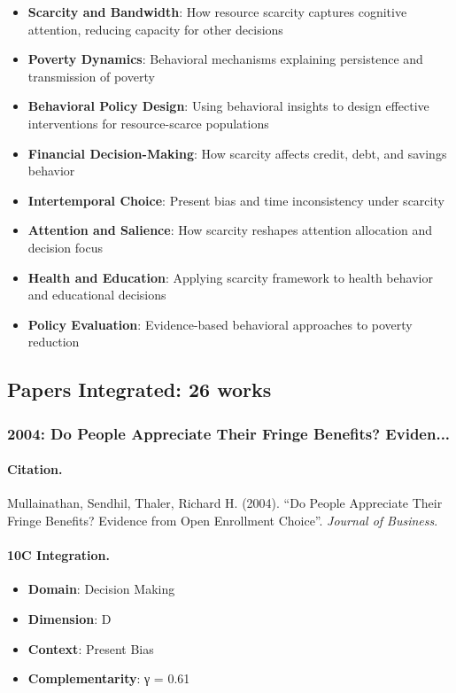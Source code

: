 \begin{itemize}
  \item \textbf{Scarcity and Bandwidth}: How resource scarcity captures cognitive attention, reducing capacity for other decisions
  \item \textbf{Poverty Dynamics}: Behavioral mechanisms explaining persistence and transmission of poverty
  \item \textbf{Behavioral Policy Design}: Using behavioral insights to design effective interventions for resource-scarce populations
  \item \textbf{Financial Decision-Making}: How scarcity affects credit, debt, and savings behavior
  \item \textbf{Intertemporal Choice}: Present bias and time inconsistency under scarcity
  \item \textbf{Attention and Salience}: How scarcity reshapes attention allocation and decision focus
  \item \textbf{Health and Education}: Applying scarcity framework to health behavior and educational decisions
  \item \textbf{Policy Evaluation}: Evidence-based behavioral approaches to poverty reduction
\end{itemize}

\subsection{Papers Integrated: 26 works}


\subsubsection{2004: Do People Appreciate Their Fringe Benefits? Eviden...}

\paragraph{Citation.}
Mullainathan, Sendhil, Thaler, Richard H. (2004). ``Do People Appreciate Their Fringe Benefits? Evidence from Open Enrollment Choice''. \textit{Journal of Business}.

\paragraph{10C Integration.}
\begin{itemize}[nosep]
  \item \textbf{Domain}: Decision Making
  \item \textbf{Dimension}: D
  \item \textbf{Context}: Present Bias
  \item \textbf{Complementarity}: γ = 0.61
\end{itemize}



